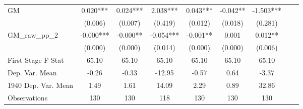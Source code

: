 \begin{tabular}{l*{8}{c}}
GM              &    0.020***&    0.024***&    2.038***&    0.043***&   -0.042** &   -1.503***\\
                &  (0.006)   &  (0.007)   &  (0.419)   &  (0.012)   &  (0.018)   &  (0.281)   \\
\addlinespace
GM\_raw\_pp\_2     &   -0.000***&   -0.000** &   -0.054***&   -0.001** &    0.001   &    0.012** \\
                &  (0.000)   &  (0.000)   &  (0.014)   &  (0.000)   &  (0.000)   &  (0.006)   \\
\midrule
First Stage F-Stat&    65.10   &    65.10   &    65.10   &    65.10   &    65.10   &    65.10   \\
Dep. Var. Mean  &    -0.26   &    -0.33   &   -12.95   &    -0.57   &     0.64   &    -3.37   \\
1940 Dep. Var. Mean&     1.49   &     1.61   &    14.09   &     2.29   &     0.89   &    32.86   \\
Observations    &      130   &      130   &      118   &      130   &      130   &      130   \\
 \bottomrule \end{tabular}
